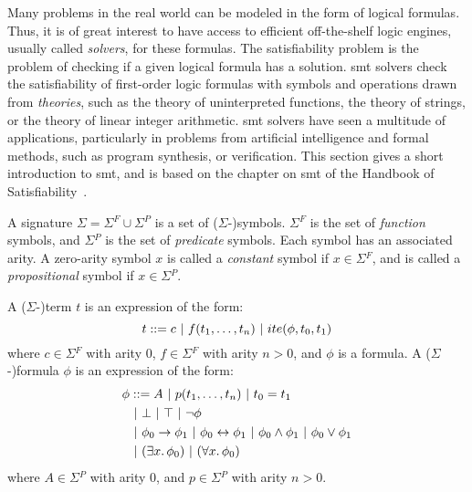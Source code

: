 
Many problems in the real world can be modeled in the form of logical formulas.
Thus, it is of great interest to have access to efficient off-the-shelf
logic engines, usually called \textit{solvers}, for these formulas.
The satisfiability problem is the problem of checking if a given logical formula
has a solution.
\gls{smt} solvers check the satisfiability of first-order logic formulas with
symbols and operations drawn from \textit{theories}, such as the theory of
uninterpreted functions, the theory of strings, or the theory of linear integer
arithmetic.
\gls{smt} solvers have seen a multitude of applications, particularly in
problems from artificial intelligence and formal methods, such as program
synthesis, or verification.
This section gives a short introduction to \gls{smt}, and is based on the
chapter on \gls{smt} of the Handbook of Satisfiability~\cite{Biere:2009:HSV}.

%

\begin{definition}[Signature]
  A signature $\Sigma{} = \Sigma{}^F \cup{} \Sigma{}^P$ is a set of
  ($\Sigma{}$-)symbols.
  $\Sigma{}^F$ is the set of \textit{function} symbols, and $\Sigma{}^P$ is the
  set of \textit{predicate} symbols.
  Each symbol has an associated arity. A zero-arity symbol $x$ is called a
  \textit{constant} symbol if $x \in \Sigma{}^F$, and is called a
  \textit{propositional} symbol if $x \in \Sigma{}^P$.
\end{definition}

\begin{definition}\label{def:terms-and-formulas}
  A ($\Sigma{}$-)term $t$ is an expression of the form:
  \[t ::= c \ |\  f(t_1,\ldots,t_n) \ |\  ite(\phi{}, t_0, t_1)\]
  where $c \in \Sigma{}^F$ with arity 0, $f \in \Sigma{}^F$ with arity
  $n > 0$, and $\phi{}$ is a formula.
  A ($\Sigma{}$-)formula $\phi{}$ is an expression of the form:
  \begin{align*}
  \phi{} &::= A
    \ |\  p(t_1,\ldots,t_n)
    \ |\  t_0 = t_1 \\
    &\ |\  \bot{}
    \ |\  \top{}
    \ |\  \neg{}\phi{} \\
    &\ |\  \phi{}_0 \rightarrow{} \phi{}_1
    \ |\  \phi{}_0 \leftrightarrow{} \phi{}_1
    \ |\  \phi{}_0 \land{} \phi{}_1
    \ |\  \phi{}_0 \lor{} \phi{}_1 \\
    &\ |\  (\exists{}x\ldotp\phi{}_0)
    \ |\  (\forall{}x\ldotp\phi{}_0)
  \end{align*}
  where $A \in \Sigma{}^P$ with arity 0, and $p \in \Sigma{}^P$ with arity
  $n > 0$.
\end{definition}

